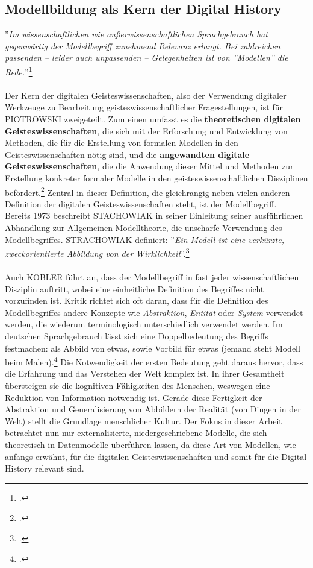 \documentclass[12pt,a4paper]{article}
\begin{document}
\subsection{Modellbildung als Kern der Digital History}
\label{Modellbildung}
''\textit{Im wissenschaftlichen wie außerwissenschaftlichen Sprachgebrauch hat gegenwärtig der Modellbegriff zunehmend Relevanz erlangt. Bei zahlreichen passenden -- leider auch unpassenden -- Gelegenheiten ist von ''Modellen'' die Rede.}''\footcite[][S.1]{stachowiak1973allgemeine}
\\
\\
Der  Kern der digitalen Geisteswissenschaften, also der Verwendung digitaler Werkzeuge zu Bearbeitung geisteswissenschaftlicher Fragestellungen, ist für PIOTROWSKI zweigeteilt. Zum einen umfasst es die \textbf{theoretischen digitalen Geisteswissenschaften}, die sich mit der Erforschung und Entwicklung von Methoden, die für die Erstellung von formalen Modellen in den Geisteswissenschaften nötig sind, und die \textbf{angewandten digitale Geisteswissenschaften}, die die Anwendung dieser Mittel und Methoden zur Erstellung konkreter formaler Modelle in den geisteswissenschaftlichen Disziplinen befördert.\footcite{piotrowski2016digital} Zentral in dieser Definition, die gleichrangig neben vielen anderen Definition der digitalen Geisteswissenschaften steht, ist der Modellbegriff.
\\
Bereits 1973 beschreibt STACHOWIAK in seiner Einleitung seiner ausführlichen Abhandlung zur Allgemeinen Modelltheorie, die unscharfe Verwendung des Modellbegriffes. STRACHOWIAK definiert: ''\textit{Ein Modell ist eine verkürzte, zweckorientierte Abbildung von der Wirklichkeit}''.\footcite[][]{stachowiak1973allgemeine}
\\
\\
Auch KOBLER führt an, dass der Modellbegriff in fast jeder wissenschaftlichen Disziplin auftritt, wobei eine einheitliche Definition des Begriffes nicht vorzufinden ist. Kritik richtet sich oft daran, dass für die Definition des Modellbegriffes andere Konzepte wie \textit{Abstraktion}, \textit{Entität} oder \textit{System} verwendet werden, die wiederum terminologisch unterschiedlich verwendet werden. Im deutschen Sprachgebrauch lässt sich eine Doppelbedeutung des Begriffs festmachen: als Abbild von etwas, sowie Vorbild für etwas (jemand steht Modell beim Malen).\footcite[][S.129]{stachowiak1973allgemeine} Die Notwendigkeit der ersten Bedeutung geht daraus hervor, dass die Erfahrung und das Verstehen der Welt komplex ist. In ihrer Gesamtheit übersteigen sie die kognitiven Fähigkeiten des Menschen, weswegen eine Reduktion von Information notwendig ist. Gerade diese Fertigkeit der Abstraktion und Generalisierung von Abbildern der Realität (von Dingen in der Welt) stellt die Grundlage menschlicher Kultur. Der Fokus in dieser Arbeit betrachtet nun nur externalisierte, niedergeschriebene Modelle, die sich theoretisch in Datenmodelle überführen lassen, da diese Art von Modellen, wie anfangs erwähnt, für die digitalen Geisteswissenschaften und somit für die Digital History relevant sind.
\end{document}

